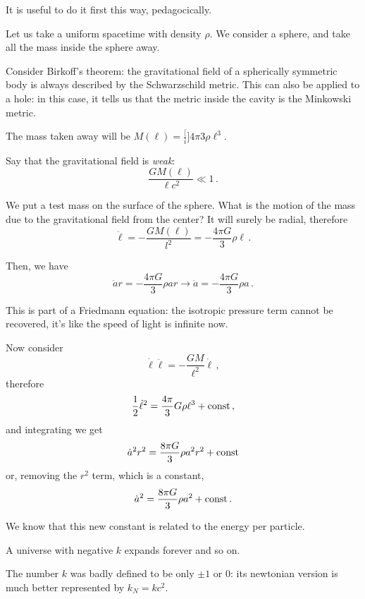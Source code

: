 \documentclass[main.tex]{subfiles}
\begin{document}
It is useful to do it first this way, pedagocically.

Let us take a uniform spacetime with density \(\rho\). We consider a sphere, and take all the mass inside the sphere away.

Consider Birkoff's theorem: the gravitational field of a spherically symmetric body is always described by the Schwarzschild metric.
This can also be applied to a hole: in this case, it tells us that the metric inside the cavity is the Minkowski metric.

The mass taken away will be \(M(\ell) = \frac[i]{4 \pi}{3} \rho \ell^{3}\).

Say that the gravitational field is \emph{weak}:
\begin{equation}
  \frac{GM(\ell)}{\ell c^2} \ll 1\,.
\end{equation}

We put a test mass on the surface of the sphere. What is the motion of the mass due to the gravitational field from the center? It will surely be radial, therefore
\begin{equation}
  \ddot{\ell} = - \frac{GM(\ell)}{l^2} = - \frac{4 \pi G}{3} \rho \ell\,.
\end{equation}

Then, we have
\begin{equation}
  \ddot{a} r = - \frac{4 \pi G}{3} \rho a r
  \to
  \ddot{a} = - \frac{4 \pi G}{3} \rho a\,.
\end{equation}

This is part of a Friedmann equation: the isotropic pressure term cannot be recovered, it's like the speed of light is infinite now.

Now consider 
\begin{equation}
  \dot{\ell} \ddot{\ell} = - \frac{GM}{\ell^2} \dot{\ell}\,,
\end{equation}
%
therefore 
%
\begin{equation}
  \frac{1}{2}\dot{\ell}^2 = \frac{4 \pi}{3} G \rho \ell^{3} + \const\,,
\end{equation}
%
and integrating we get
%
\begin{equation}
  \dot{a}^2 r^2 = \frac{8 \pi G}{3} \rho a^2 r^2 + \const
\end{equation}
%
or, removing the \(r^2\) term, which is a constant,
%
\begin{equation}
    \dot{a}^2 = \frac{8 \pi G}{3} \rho a^2 + \const\,.
\end{equation}

We know that this new constant is related to the energy per particle. 

A universe with negative \(k\) expands forever and so on.

The number \(k\) was badly defined to be only \(\pm 1\) or 0: its newtonian version is much better represented by \(k_N = kc^2\).
\end{document}
